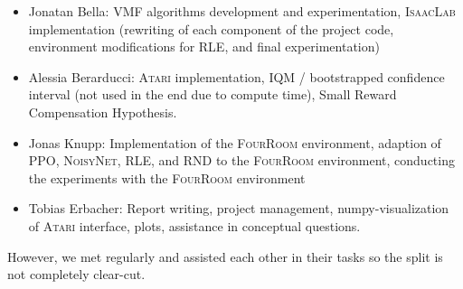 \documentclass[10pt]{article} %
\begin{document}
\begin{itemize}
  \item Jonatan Bella: VMF algorithms development and experimentation, \textsc{IsaacLab} implementation (rewriting of each component of the project code, environment modifications for \textsc{RLE}, and final experimentation)
  \item Alessia Berarducci: \textsc{Atari} implementation, IQM / bootstrapped confidence interval (not used in the end due to compute time), Small Reward Compensation Hypothesis.
  \item Jonas Knupp: Implementation of the \textsc{FourRoom} environment, adaption of \textsc{PPO}, \textsc{NoisyNet}, \textsc{RLE}, and \textsc{RND} to the \textsc{FourRoom} environment, conducting the experiments with the \textsc{FourRoom} environment
  \item Tobias Erbacher: Report writing, project management, numpy-visualization of \textsc{Atari} interface, plots, assistance in conceptual questions.
\end{itemize}

\noindent However, we met regularly and assisted each other in their tasks so the split is not completely clear-cut.






\end{document}
